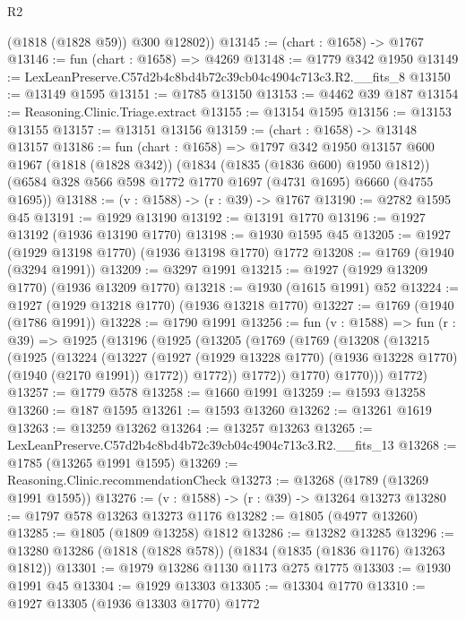 \begin{lexlean}{R2}
\begin{coremodule}
        (@1818 (@1828 @59))
        @300
        @12802))
@13145 := (chart : @1658) -> @1767
@13146 := fun (chart : @1658) => @4269
@13148 := @1779 @342 @1950
@13149 := LexLeanPreserve.C57d2b4c8bd4b72c39cb04c4904c713c3.R2.__fits_8
@13150 := @13149 @1595
@13151 := @1785 @13150
@13153 := @4462 @39 @187
@13154 := Reasoning.Clinic.Triage.extract
@13155 := @13154 @1595
@13156 := @13153 @13155
@13157 := @13151 @13156
@13159 := (chart : @1658) -> @13148 @13157
@13186 := fun (chart : @1658) =>
  @1797
    @342
    @1950
    @13157
    @600
    @1967
    (@1818 (@1828 @342))
    (@1834 (@1835 (@1836 @600) @1950 @1812))
    (@6584 @328 @566 @598 @1772 @1770 @1697 (@4731 @1695) @6660 (@4755 @1695))
@13188 := (v : @1588) -> (r : @39) -> @1767
@13190 := @2782 @1595 @45
@13191 := @1929 @13190
@13192 := @13191 @1770
@13196 := @1927 @13192 (@1936 @13190 @1770)
@13198 := @1930 @1595 @45
@13205 := @1927 (@1929 @13198 @1770) (@1936 @13198 @1770) @1772
@13208 := @1769 (@1940 (@3294 @1991))
@13209 := @3297 @1991
@13215 := @1927 (@1929 @13209 @1770) (@1936 @13209 @1770)
@13218 := @1930 (@1615 @1991) @52
@13224 := @1927 (@1929 @13218 @1770) (@1936 @13218 @1770)
@13227 := @1769 (@1940 (@1786 @1991))
@13228 := @1790 @1991
@13256 := fun (v : @1588) =>
  fun (r : @39) =>
  @1925
    (@13196
      (@1925
        (@13205
          (@1769
            (@1769
              (@13208
                (@13215
                  (@1925
                    (@13224
                      (@13227
                        (@1927
                          (@1929 @13228 @1770)
                          (@1936 @13228 @1770)
                          (@1940 (@2170 @1991))
                          @1772))
                      @1772))
                  @1772))
              @1770)
            @1770)))
      @1772)
@13257 := @1779 @578
@13258 := @1660 @1991
@13259 := @1593 @13258
@13260 := @187 @1595
@13261 := @1593 @13260
@13262 := @13261 @1619
@13263 := @13259 @13262
@13264 := @13257 @13263
@13265 := LexLeanPreserve.C57d2b4c8bd4b72c39cb04c4904c713c3.R2.__fits_13
@13268 := @1785 (@13265 @1991 @1595)
@13269 := Reasoning.Clinic.recommendationCheck
@13273 := @13268 (@1789 (@13269 @1991 @1595))
@13276 := (v : @1588) -> (r : @39) -> @13264 @13273
@13280 := @1797 @578 @13263 @13273 @1176
@13282 := @1805 (@4977 @13260)
@13285 := @1805 (@1809 @13258) @1812
@13286 := @13282 @13285
@13296 := @13280 @13286 (@1818 (@1828 @578)) (@1834 (@1835 (@1836 @1176) @13263 @1812))
@13301 := @1979 @13286 @1130 @1173 @275 @1775
@13303 := @1930 @1991 @45
@13304 := @1929 @13303
@13305 := @13304 @1770
@13310 := @1927 @13305 (@1936 @13303 @1770) @1772

\end{coremodule}
\end{lexlean}
